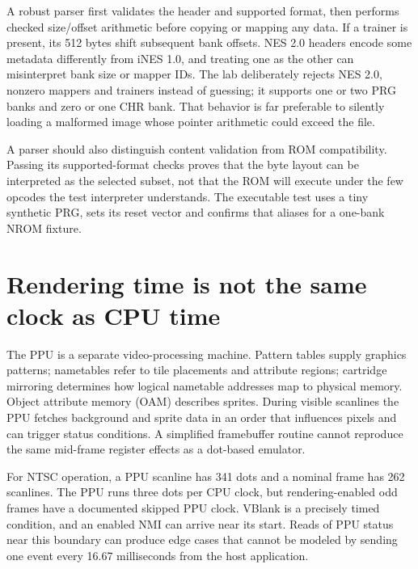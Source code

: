 A robust parser first validates the header and supported format, then performs checked size/offset arithmetic before copying or mapping any data. If a trainer is present, its 512 bytes shift subsequent bank offsets. NES 2.0 headers encode some metadata differently from iNES 1.0, and treating one as the other can misinterpret bank size or mapper IDs. The lab deliberately rejects NES 2.0, nonzero mappers and trainers instead of guessing; it supports one or two PRG banks and zero or one CHR bank. That behavior is far preferable to silently loading a malformed image whose pointer arithmetic could exceed the file.

A parser should also distinguish content validation from ROM compatibility. Passing its supported-format checks proves that the byte layout can be interpreted as the selected subset, not that the ROM will execute under the few opcodes the test interpreter understands. The executable test uses a tiny synthetic PRG, sets its reset vector and confirms that  aliases  for a one-bank NROM fixture.

\section{Rendering time is not the same clock as CPU time}\label{01-foundations-i-ch016-rendering-time-is-not-the-same-clock-as-cpu-time}

\hypertarget{01-foundations-i-ch016-rendering-time-is-not-the-same-clock-as-cpu-time}{}

The PPU is a separate video-processing machine. Pattern tables supply graphics patterns; nametables refer to tile placements and attribute regions; cartridge mirroring determines how logical nametable addresses map to physical memory. Object attribute memory (OAM) describes sprites. During visible scanlines the PPU fetches background and sprite data in an order that influences pixels and can trigger status conditions. A simplified framebuffer routine cannot reproduce the same mid-frame register effects as a dot-based emulator.

For NTSC operation, a PPU scanline has 341 dots and a nominal frame has 262 scanlines. The PPU runs three dots per CPU clock, but rendering-enabled odd frames have a documented skipped PPU clock. VBlank is a precisely timed condition, and an enabled NMI can arrive near its start. Reads of PPU status near this boundary can produce edge cases that cannot be modeled by sending one event every 16.67 milliseconds from the host application.

